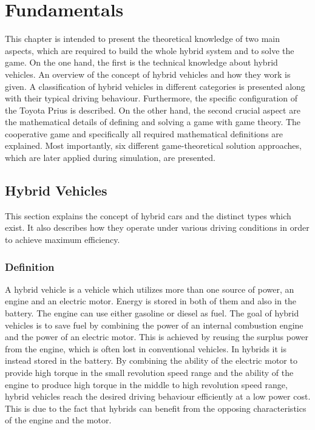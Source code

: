 \chapter{Fundamentals}
\label{chp:fundamentals}
This chapter is intended to present the theoretical knowledge of two main aspects, which are required to build the whole hybrid system and to solve the game. On the one hand, the first is the technical knowledge about hybrid vehicles. An overview of the concept of hybrid vehicles and how they work is given. A classification of hybrid vehicles in different categories is presented along with their typical driving behaviour. Furthermore, the specific configuration of the Toyota Prius is described. On the other hand, the second crucial aspect are the mathematical details of defining and solving a game with game theory. The cooperative game and specifically all required mathematical definitions are explained. Most importantly, six different game-theoretical solution approaches, which are later applied during simulation, are presented.

\section{Hybrid Vehicles}
This section explains the concept of hybrid cars and the distinct types which exist. It also describes how they operate under various driving conditions in order to achieve maximum efficiency.

\subsection{Definition}
A hybrid vehicle is a vehicle which utilizes more than one source of power, an engine and an electric motor. Energy is stored in both of them and also in the battery. The engine can use either gasoline or diesel as fuel. The goal of hybrid vehicles is to save fuel by combining the power of an internal combustion engine and the power of an electric motor. This is achieved by reusing the surplus power from the engine, which is often lost in conventional vehicles. In hybrids it is instead stored in the battery. By combining the ability of the electric motor to provide high torque in the small revolution speed range and the ability of the engine to produce high torque in the middle to high revolution speed range, hybrid vehicles reach the desired driving behaviour efficiently at a low power cost. This is due to the fact that hybrids can benefit from the opposing characteristics of the engine and the motor.

